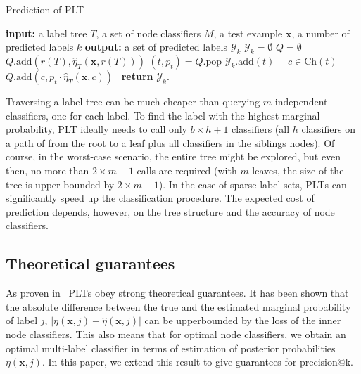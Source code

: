 \documentclass{article}
\newcommand{\Algo}[1]{\textsc{#1}}
\renewcommand{\vec}[1]{\boldsymbol{#1}}
\newcommand{\bx}{\vec{x}}
\newcommand{\calY}{\mathcal{Y}}
\newcommand{\heta}{\hat{\eta}}
\newcommand{\Children}[1]{\mathrm{Ch}(#1)}
\newcommand{\sectionBefore}{-0pt}
\newcommand{\sectionAfter}{-0pt}
\begin{document}
\begin{algorithm}[t]
\caption{Prediction of \Algo{PLT}} %
\label{alg:pt-prediction}
\begin{algorithmic}[1]
\State \textbf{input:} a label tree $T$,  a set of node classifiers $M$, a test example $\bx$, a number of predicted labels $k$ 
\State \textbf{output:} a set of predicted labels $\calY_k$ 
\State $\calY_k = \emptyset$
\State $Q = \emptyset$ 
\State $Q.\mathrm{add}(r(T),\heta_T(\bx,r(T)))$ 
\While{$|\calY_k| < k$}
\State $(t,p_t) = Q.\mathrm{pop}$
 $\calY_k.\mathrm{add}(t)$ 
\Else \ \algorithmicfor\ $c \in \Children{t}$\ \algorithmicdo\ $Q.\mathrm{add}(c, p_t \cdot \heta_T(\bx,c))$\ 
\EndIf
\EndWhile
\State \textbf{return} $\calY_k$. 
\end{algorithmic}
\end{algorithm} 

Traversing a label tree can be much cheaper than querying $m$ independent classifiers, one for each label. To find the label with the highest marginal probability, \Algo{PLT} ideally needs to call only $b\times h+1$ classifiers (all $h$ classifiers on a path of from the root to a leaf plus all classifiers in the siblings nodes). Of course, in the worst-case scenario, the entire tree might be explored, but even then, no more than $2 \times m-1$ calls are required (with $m$ leaves, the size of the tree is upper bounded by $2 \times m-1$). In the case of sparse label sets, \Algo{PLT}s can significantly speed up the classification procedure. The expected cost of prediction depends, however, on the tree structure and the accuracy of node classifiers.

\vspace{\sectionBefore}
\subsection{Theoretical guarantees}
\label{sec:regret}
\vspace{\sectionAfter}

As proven in~\citep{Jasinska_et_al_2016}  \Algo{PLT}s obey strong theoretical guarantees. It has been shown that the absolute difference between the true and the estimated marginal probability of label $j$, $|\eta(\bx,j) - \heta(\bx,j)|$ can be upperbounded by the loss of the inner node classifiers. This also means that for optimal node classifiers, we obtain an optimal multi-label classifier in terms of estimation of posterior probabilities $\eta(\bx,j)$. In this paper, we extend this result to give guarantees for precision@k. 
\end{document}

